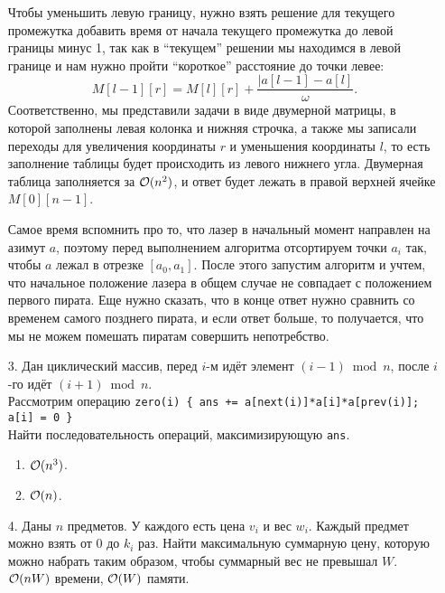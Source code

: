 \begin{enumerate}
  Чтобы уменьшить левую границу, нужно взять решение для текущего промежутка добавить время от начала текущего промежутка до левой границы минус 1, так как в ``текущем'' решении мы находимся в левой границе и нам нужно пройти ``короткое'' расстояние до точки левее:
  \begin{equation}
    M[l-1][r] = M[l][r] + \dfrac{|a[l-1]-a[l]}{\omega}.
  \end{equation}
  Соответственно, мы представили задачи в виде двумерной матрицы, в которой заполнены левая колонка и нижняя строчка, а также мы записали переходы для увеличения координаты $r$ и уменьшения координаты $l$, то есть заполнение таблицы будет происходить из левого нижнего угла. Двумерная таблица заполняется за $\mathcal{O}(n^2)$, и ответ будет лежать в правой верхней ячейке $M[0][n-1]$.

  Самое время вспомнить про то, что лазер в начальный момент направлен на азимут $a$, поэтому перед выполнением алгоритма отсортируем точки $a_i$ так, чтобы $a$ лежал в отрезке $[a_0, a_1]$. После этого запустим алгоритм и учтем, что начальное положение лазера в общем случае не совпадает с положением первого пирата. Еще нужно сказать, что в конце ответ нужно сравнить со временем самого позднего пирата, и если ответ больше, то получается, что мы не можем помешать пиратам совершить непотребство.


  \item[3.]
    Дан циклический массив, перед $i$-м идёт элемент $(i{-}1) \bmod n$,
    после $i$-го идёт $(i{+}1) \bmod n$. \\
    Рассмотрим операцию \texttt{zero(i) \{ ans += a[next(i)]*a[i]*a[prev(i)]; a[i] = 0 \}}\\
    Найти последовательность операций, максимизирующую \texttt{ans}.
    \begin{enumerate}
      \item $\mathcal{O}(n^3)$.
      \item $\mathcal{O}(n)$.
    \end{enumerate}

  \item[4.]
    Даны $n$ предметов. У каждого есть цена $v_i$ и вес $w_i$. Каждый предмет можно взять
    от $0$ до $k_i$ раз. Найти максимальную суммарную цену,
    которую можно набрать таким образом, чтобы суммарный вес не превышал $W$.
    $\mathcal{O}(nW)$ времени, $\mathcal{O}(W)$ памяти.


\end{enumerate}
